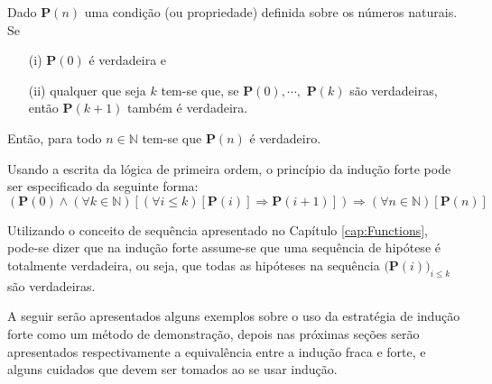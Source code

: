 \begin{definicao}\label{def:InducaoForte}
	Dado \textbf{P}$(n)$ uma condição (ou propriedade) definida sobre os números naturais. Se
	\begin{itemize}
		\item[(i)] \textbf{P}$(0)$ é verdadeira e
		\item[(ii)] qualquer que seja $k$ tem-se que, se  \textbf{P}$(0), \cdots,$ \textbf{P}$(k)$ são verdadeiras, então \textbf{P}$(k + 1)$ também é verdadeira. 
	\end{itemize}
	Então, para todo $n \in \mathbb{N}$  tem-se que $\textbf{P}(n)$ é verdadeiro.
\end{definicao}

Usando a escrita da lógica de primeira ordem, o princípio da indução forte pode ser especificado da seguinte forma: 
$$(\textbf{P}(0) \land (\forall k \in \mathbb{N})[(\forall i \leq k)[\textbf{P}(i)] \Rightarrow \textbf{P}(i+1)]) \Rightarrow (\forall n \in \mathbb{N})[\textbf{P}(n)]$$ 

Utilizando o conceito de sequência apresentado no Capítulo \ref{cap:Functions}, pode-se dizer que na indução forte assume-se que uma sequência  de hipótese é totalmente verdadeira, ou seja, que todas as hipóteses na sequência $($\textbf{P}$(i))_{i \leq k}$ são verdadeiras. 

A seguir serão apresentados alguns exemplos sobre o uso da estratégia de indução forte como um método de demonstração, depois nas próximas seções serão apresentados respectivamente a equivalência entre a indução fraca e forte, e alguns cuidados que devem ser tomados ao se usar indução.

